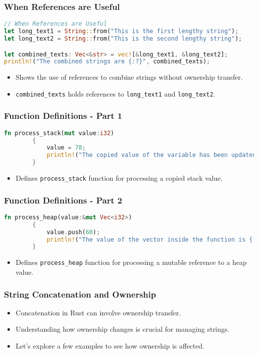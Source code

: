 \documentclass[aspectratio=169, table]{beamer}
\begin{document}
\begin{frame}[fragile]
\frametitle{When References are Useful}
\begin{lstlisting}[language=Rust]
// When References are Useful
let long_text1 = String::from("This is the first lengthy string"); 
let long_text2 = String::from("This is the second lengthy string"); 

let combined_texts: Vec<&str> = vec![&long_text1, &long_text2];  
println!("The combined strings are {:?}", combined_texts);
\end{lstlisting}
\begin{itemize}
\item Shows the use of references to combine strings without ownership transfer.
\item \texttt{combined\_texts} holds references to \texttt{long\_text1} and \texttt{long\_text2}.
\end{itemize}
\end{frame}

\begin{frame}[fragile]
	\frametitle{Function Definitions - Part 1}
	\begin{lstlisting}[language=Rust]
		fn process_stack(mut value:i32)    
		{   
			value = 78; 
			println!("The copied value of the variable has been updated to {}", value); 
		}
	\end{lstlisting}
	\begin{itemize}
		\item Defines \texttt{process\_stack} function for processing a copied stack value.
	\end{itemize}
\end{frame}

\begin{frame}[fragile]
	\frametitle{Function Definitions - Part 2}
	\begin{lstlisting}[language=Rust]
		fn process_heap(value:&mut Vec<i32>)    
		{
			value.push(60);    
			println!("The value of the vector inside the function is {:?}", value); 
		}
	\end{lstlisting}
	\begin{itemize}
		\item Defines \texttt{process\_heap} function for processing a mutable reference to a heap value.
	\end{itemize}
\end{frame}


\begin{frame}[fragile]
\frametitle{String Concatenation and Ownership}
\begin{itemize}
\item Concatenation in Rust can involve ownership transfer.
\item Understanding how ownership changes is crucial for managing strings.
\item Let's explore a few examples to see how ownership is affected.
\end{itemize}
\end{frame}
\end{document}
